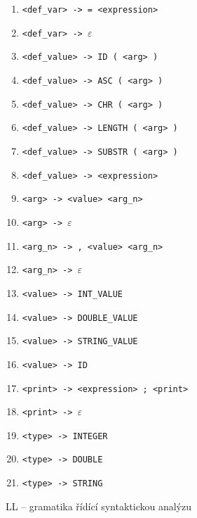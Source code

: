 \documentclass[a4paper, 11pt]{article}
\begin{document}
\begin{table}[!ht]
\begin{enumerate}[noitemsep]
			\item \verb|<def_var> -> = <expression>|
			\item \verb|<def_var> -> |$\varepsilon$

			\item \verb|<def_value> -> ID ( <arg> )|
			\item \verb|<def_value> -> ASC ( <arg> )|
			\item \verb|<def_value> -> CHR ( <arg> )|
			\item \verb|<def_value> -> LENGTH ( <arg> )|
			\item \verb|<def_value> -> SUBSTR ( <arg> )|
			\item \verb|<def_value> -> <expression>|

			\item \verb|<arg> -> <value> <arg_n>|
			\item \verb|<arg> -> |$\varepsilon$

			\item \verb|<arg_n> -> , <value> <arg_n>|
			\item \verb|<arg_n> -> |$\varepsilon$

			\item \verb|<value> -> INT_VALUE|
			\item \verb|<value> -> DOUBLE_VALUE|
			\item \verb|<value> -> STRING_VALUE|
			\item \verb|<value> -> ID|

			\item \verb|<print> -> <expression> ; <print>|
			\item \verb|<print> -> |$\varepsilon$

			\item \verb|<type> -> INTEGER|
			\item \verb|<type> -> DOUBLE|
			\item \verb|<type> -> STRING|
		\end{enumerate}

		\caption{LL -- gramatika řídící syntaktickou analýzu}
		\label{table:ll_gramatika}
	\end{table}
\end{document}
